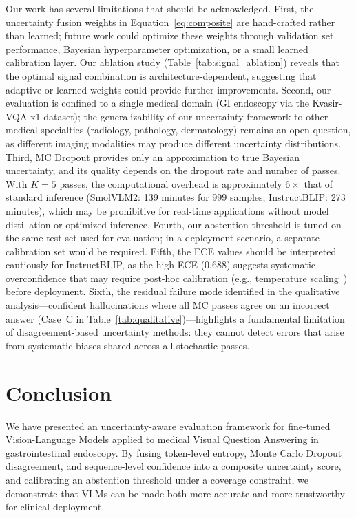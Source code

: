 \documentclass[pdflatex,sn-mathphys-num]{sn-jnl}
\begin{document}
Our work has several limitations that should be acknowledged. First, the uncertainty fusion weights in Equation~\ref{eq:composite} are hand-crafted rather than learned; future work could optimize these weights through validation set performance, Bayesian hyperparameter optimization, or a small learned calibration layer. Our ablation study (Table~\ref{tab:signal_ablation}) reveals that the optimal signal combination is architecture-dependent, suggesting that adaptive or learned weights could provide further improvements. Second, our evaluation is confined to a single medical domain (GI endoscopy via the Kvasir-VQA-x1 dataset); the generalizability of our uncertainty framework to other medical specialties (radiology, pathology, dermatology) remains an open question, as different imaging modalities may produce different uncertainty distributions. Third, MC Dropout provides only an approximation to true Bayesian uncertainty, and its quality depends on the dropout rate and number of passes. With $K = 5$ passes, the computational overhead is approximately $6\times$ that of standard inference (SmolVLM2: 139 minutes for 999 samples; InstructBLIP: 273 minutes), which may be prohibitive for real-time applications without model distillation or optimized inference. Fourth, our abstention threshold is tuned on the same test set used for evaluation; in a deployment scenario, a separate calibration set would be required. Fifth, the ECE values should be interpreted cautiously for InstructBLIP, as the high ECE (0.688) suggests systematic overconfidence that may require post-hoc calibration (e.g., temperature scaling~\cite{guo2017calibration}) before deployment. Sixth, the residual failure mode identified in the qualitative analysis---confident hallucinations where all MC passes agree on an incorrect answer (Case~C in Table~\ref{tab:qualitative})---highlights a fundamental limitation of disagreement-based uncertainty methods: they cannot detect errors that arise from systematic biases shared across all stochastic passes.

\section{Conclusion}\label{sec:conclusion}

We have presented an uncertainty-aware evaluation framework for fine-tuned Vision-Language Models applied to medical Visual Question Answering in gastrointestinal endoscopy. By fusing token-level entropy, Monte Carlo Dropout disagreement, and sequence-level confidence into a composite uncertainty score, and calibrating an abstention threshold under a coverage constraint, we demonstrate that VLMs can be made both more accurate and more trustworthy for clinical deployment.
\end{document}
